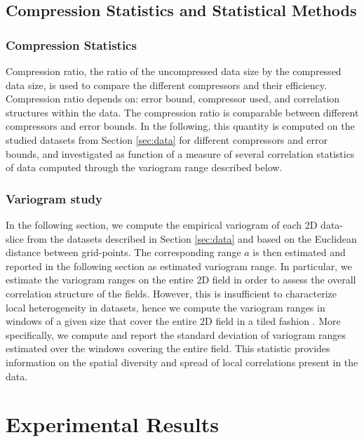 \documentclass[conference]{IEEEtran}
\begin{document}
\subsection{Compression Statistics and Statistical Methods}\label{sec:stats}

\subsubsection{Compression Statistics}
Compression ratio, the ratio of the uncompressed data size by the compressed data size, is used to compare the different compressors and their efficiency. Compression ratio depends on: error bound, compressor used, and correlation structures within the data.  The compression ratio is comparable between different compressors and error bounds. 
In the following, this quantity is computed on the studied datasets from Section \ref{sec:data} for different compressors and error bounds, and investigated as function of a measure of several correlation statistics of data computed through the variogram range described below. 


\subsubsection{Variogram study}
In the following section, we compute the empirical variogram of each 2D data-slice from the datasets described in Section \ref{sec:data} and based on the Euclidean distance between grid-points. %
The corresponding range $a$ is then estimated and reported in the following section as  estimated variogram range.  
In particular, we estimate the variogram ranges on the entire 2D field in order to assess the overall correlation structure of the fields. 
However, this is insufficient to characterize local heterogeneity in datasets, hence we compute the variogram ranges in windows of a given size that cover the entire 2D field in a tiled fashion \cite{bessac2019}. 
More specifically, we compute and report the standard deviation of  variogram ranges estimated over the windows covering the entire field. 
This statistic provides information on the spatial diversity and spread of local correlations present in the data. 







\section{Experimental Results}\label{sec:compressability:results}
\end{document}

